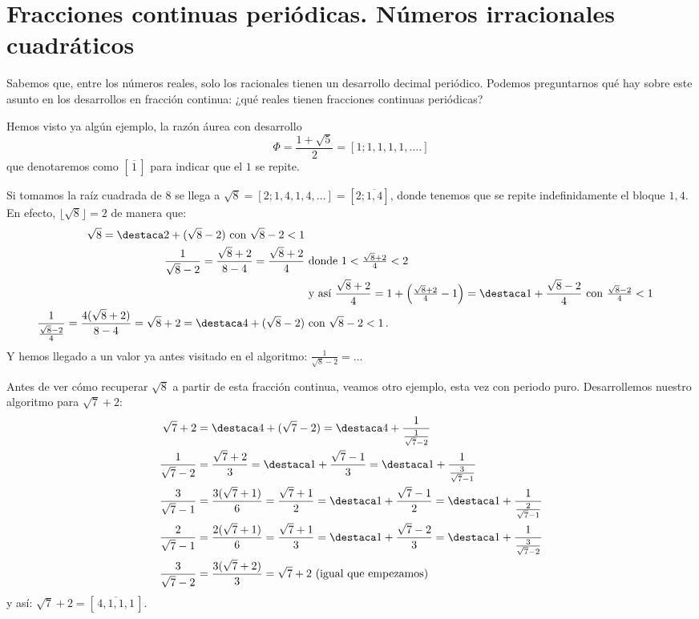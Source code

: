 \section{Fracciones continuas periódicas. Números irracionales cuadráticos}
Sabemos que, entre los números reales, solo los racionales tienen un desarrollo decimal periódico. Podemos preguntarnos qué hay sobre este asunto en los desarrollos en fracción continua: ¿qué reales tienen fracciones continuas periódicas?

Hemos visto ya algún ejemplo, la razón áurea con desarrollo
$$
\Phi=\frac{1+\sqrt5}2=[1;1,1,1,1,....]
$$
que denotaremos como $[\,\overline 1\,]$ para indicar que el $1$ se repite.

Si tomamos la raíz cuadrada de $8$ se llega a $\sqrt8=[2;1,4,1,4,...]=[2;\overline{1,4}]$, donde tenemos que se repite indefinidamente el bloque $1,4$. En efecto, $\lfloor\sqrt8\rfloor=2$ de manera que:
\begin{align*}
\sqrt8=\destaca2+(\sqrt8-2) \text{ con }\sqrt8-2<1\\
\frac1{\sqrt8-2}=\frac{\sqrt8+2}{8-4}=\frac{\sqrt8+2}{4}
&\text{ donde } 1<\tfrac{\sqrt8+2}{4}<2\\
&\text{ y así }\frac{\sqrt8+2}{4}=1+\left(\tfrac{\sqrt8+2}{4}-1\right)=
\destaca1+\frac{\sqrt8-2}{4}
\text{ con }\tfrac{\sqrt8-2}{4}<1\\
\frac1{\frac{\sqrt8-2}4}=\frac{4(\sqrt8+2)}{8-4}=\sqrt8+2=\destaca4+(\sqrt8-2)
&\text{ con }\sqrt8-2<1\,.
\end{align*}
Y hemos llegado a un valor ya antes visitado en el algoritmo: $\frac1{\sqrt8-2}=\dots$

Antes de ver cómo recuperar $\sqrt8$ a partir de esta fracción continua, veamos otro ejemplo, esta vez con periodo puro. Desarrollemos nuestro algoritmo para $\sqrt7+2$:
\begin{align*}
\sqrt7+2&=\destaca4 +(\sqrt7-2)=\destaca4+\frac1{\frac 1{\sqrt7-2}}\\
\frac1{\sqrt7-2}&=\frac{\sqrt7+2}{3}=\destaca1+\frac{\sqrt7-1}{3}=\destaca1+
\frac1{\frac3{\sqrt7-1}}\\
\frac3{\sqrt7-1}&=\frac{3(\sqrt7+1)}{6}=\frac{\sqrt7+1}{2}=\destaca1+
\frac{\sqrt7-1}{2}=\destaca1+\frac1{\frac2{\sqrt7-1}}\\
\frac2{\sqrt7-1}&=\frac{2(\sqrt7+1)}{6}=\frac{\sqrt7+1}{3}=
\destaca1+\frac{\sqrt7-2}{3}=\destaca1+\frac1{\frac3{\sqrt7-2}}\\
\frac3{\sqrt7-2}&=\frac{3(\sqrt7+2)}{3}=\sqrt7+2\,\, \text{(igual que empezamos)}
\end{align*}
y así: $\sqrt7+2=[\,\overline{4,1,1,1}\,]$.

